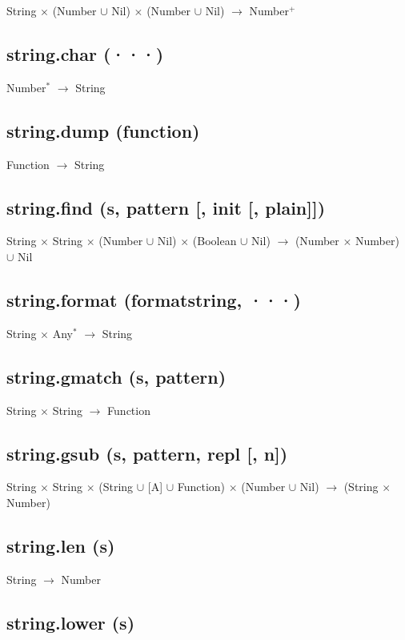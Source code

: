 \documentclass[12pt]{article}
\begin{document}
String $\times$
(Number $\cup$ Nil) $\times$
(Number $\cup$ Nil) $\rightarrow$
Number$^+$

\subsection{string.char (···)}

Number$^*$ $\rightarrow$ String

\subsection{string.dump (function)}

Function $\rightarrow$ String

\subsection{string.find (s, pattern [, init [, plain]])}

String $\times$ String $\times$
(Number $\cup$ Nil) $\times$
(Boolean $\cup$ Nil) $\rightarrow$
(Number $\times$ Number) $\cup$ Nil

\subsection{string.format (formatstring, ···)}

String $\times$ Any$^*$ $\rightarrow$ String

\subsection{string.gmatch (s, pattern)}

String $\times$ String $\rightarrow$ Function

\subsection{string.gsub (s, pattern, repl [, n])}

String $\times$
String $\times$
(String $\cup$ [A] $\cup$ Function) $\times$
(Number $\cup$ Nil) $\rightarrow$
(String $\times$ Number)

\subsection{string.len (s)}

String $\rightarrow$ Number

\subsection{string.lower (s)}
\end{document}
